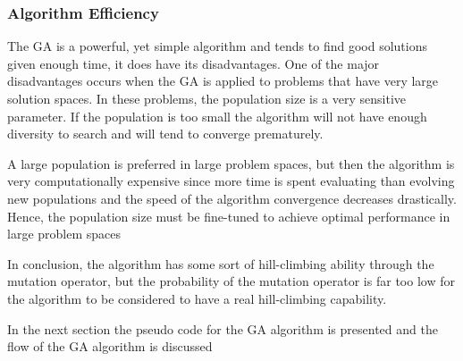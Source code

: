 \subsubsection{Algorithm Efficiency}
The GA is a powerful, yet simple algorithm and tends to find good solutions given enough time, it does have its disadvantages. One of the major disadvantages occurs when the GA is applied to problems that have very large solution spaces. In these problems, the population size is a very sensitive parameter\cite{AdaptiveSAGA,HetergeneousGA,SelfAdaptiveDataMiningGA,PatternDetectionGA}. If the population is too small the algorithm will not have enough diversity to search and will tend to converge prematurely. 

A large population is preferred in large problem spaces, but then the algorithm is very computationally expensive since more time is spent evaluating than evolving new populations and the speed of the algorithm convergence decreases drastically. Hence, the population size must be fine-tuned to achieve optimal performance in large problem spaces \cite{AdaptiveSAGA,CompuIntelligenceIntro}

In conclusion, the algorithm has some sort of hill-climbing ability through the mutation operator, but the probability of the mutation operator is far too low for the algorithm to be considered to have a real hill-climbing capability.

In the next section the pseudo code for the GA algorithm is presented and the flow of the GA algorithm is discussed

